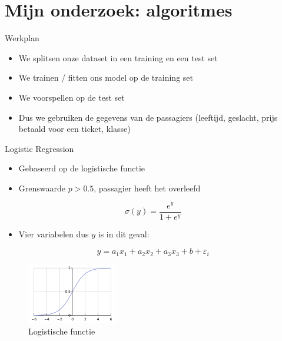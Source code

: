 \documentclass[presentation]{beamer}
\begin{document}
\section*{Mijn onderzoek: algoritmes}
\label{sec:orga491c8b}

\begin{frame}[label={sec:orgb99d471}]{Werkplan}
\begin{itemize}
\item We splitsen onze dataset in een training en een test set
\item We trainen / fitten ons model op de training set
\item We voorspellen op de test set
\item Dus we gebruiken de gegevens van de passagiers (leeftijd, geslacht, prijs betaald voor een ticket, klasse)
\end{itemize}
\end{frame}


\begin{frame}[label={sec:org336a168}]{Logistic Regression}
\begin{itemize}
\item Gebaseerd op de logistische functie
\item Grenswaarde \(p>0.5\), passagier heeft het overleefd
\end{itemize}

\begin{equation}
\label{eq:2}
\sigma(y) = \frac{e^y}{1+e^y}
\end{equation}

\begin{itemize}
\item Vier variabelen dus \(y\) is in dit geval:
\end{itemize}

\begin{equation}
y=a_1x_1+a_2x_2+a_3x_3+b+\varepsilon_{i} 
\end{equation}

\begin{figure}[htbp]
\centering
\includegraphics[width=150]{./LogisticCurve.png}
\caption{Logistische functie}
\end{figure}
\end{frame}
\end{document}
